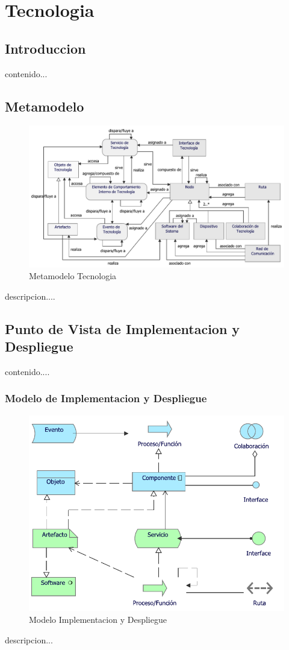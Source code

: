 \chapter{Tecnologia}
\section{Introduccion}
contenido...

\newpage

\section{Metamodelo}
\begin{figure}[h!]
	\centering
	\includegraphics[width=0.9\linewidth]{imgs/meta/Tecnologia}
	\caption{Metamodelo Tecnologia}
\end{figure}

descripcion....

\newpage

\section{Punto de Vista de Implementacion y Despliegue}
contenido....
\subsection{Modelo de Implementacion y Despliegue}
\begin{figure}[h!]
	\centering
	\includegraphics[width=.5\linewidth]{imgs/modelo/Implementacion}
	\caption{Modelo Implementacion y Despliegue}
\end{figure}
descripcion...

